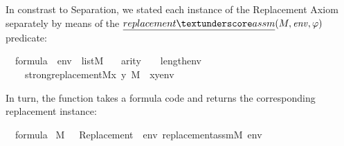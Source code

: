 In constrast to Separation, we stated each instance of the Replacement
Axiom separately by means of the
$\isa{replacement{\uscore}assm}(M,\mathit{env},\phi)$ predicate:
\begin{isabelle}
{\isasymphi}\ {\isasymin}\ formula\ {\isasymlongrightarrow}\ env\ {\isasymin}\ list{\isacharparenleft}{\kern0pt}M{\isacharparenright}{\kern0pt}\ {\isasymlongrightarrow}\isanewline
\ \ arity{\isacharparenleft}{\kern0pt}{\isasymphi}{\isacharparenright}{\kern0pt}\ {\isasymle}\ {}\ {\isacharplus}{\kern0pt}\isactrlsub {\isasymomega}\ length{\isacharparenleft}{\kern0pt}env{\isacharparenright}{\kern0pt}\ {\isasymlongrightarrow}\isanewline
\ \ \ \ strong{\isacharunderscore}{\kern0pt}replacement{\isacharparenleft}{\kern0pt}{\isacharhash}{\kern0pt}{\isacharhash}{\kern0pt}M{\isacharcomma}{\kern0pt}{\isasymlambda}x\ y{\isachardot}{\kern0pt}\ {\isacharparenleft}{\kern0pt}M\ {\isacharcomma}{\kern0pt}\ {\isacharbrackleft}{\kern0pt}x{\isacharcomma}{\kern0pt}y{\isacharbrackright}{\kern0pt}{\isacharat}{\kern0pt}env\ {\isasymTurnstile}\ {\isasymphi}{\isacharparenright}{\kern0pt}{\isacharparenright}{\kern0pt}{\isachardoublequoteclose}
\end{isabelle}
In turn, the  function
takes a formula code and returns the corresponding replacement
instance:
\begin{isabelle}
{\isasymphi}\ {\isasymin}\ formula\ {\isasymLongrightarrow}\isanewline
{\isacharparenleft}{\kern0pt}M{\isacharcomma}{\kern0pt}\ {\isacharbrackleft}{\kern0pt}{\isacharbrackright}{\kern0pt}\ {\isasymTurnstile}\ {\isasymcdot}Replacement{\isacharparenleft}{\kern0pt}{\isasymphi}{\isacharparenright}{\kern0pt}{\isasymcdot}{\isacharparenright}{\kern0pt}\ {\isasymlongleftrightarrow}\ {\isacharparenleft}{\kern0pt}{\isasymforall}env{\isachardot}{\kern0pt}\ replacement{\isacharunderscore}{\kern0pt}assm{\isacharparenleft}{\kern0pt}M{\isacharcomma}{\kern0pt}\ env{\isacharcomma}{\kern0pt}\ {\isasymphi}{\isacharparenright}{\kern0pt}{\isacharparenright}
\end{isabelle}

